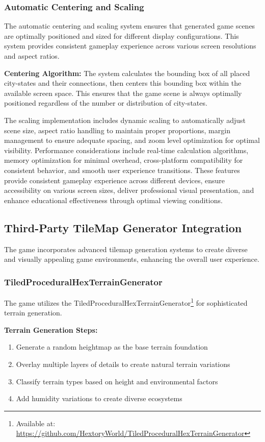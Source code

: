 \documentclass[english]{tudscrreprt}
\begin{document}
\subsubsection{Automatic Centering and Scaling}
The automatic centering and scaling system ensures that generated game scenes are optimally positioned and sized for different display configurations. This system provides consistent gameplay experience across various screen resolutions and aspect ratios.

\textbf{Centering Algorithm:}
The system calculates the bounding box of all placed city-states and their connections, then centers this bounding box within the available screen space. This ensures that the game scene is always optimally positioned regardless of the number or distribution of city-states.

The scaling implementation includes dynamic scaling to automatically adjust scene size, aspect ratio handling to maintain proper proportions, margin management to ensure adequate spacing, and zoom level optimization for optimal visibility. Performance considerations include real-time calculation algorithms, memory optimization for minimal overhead, cross-platform compatibility for consistent behavior, and smooth user experience transitions. These features provide consistent gameplay experience across different devices, ensure accessibility on various screen sizes, deliver professional visual presentation, and enhance educational effectiveness through optimal viewing conditions.

\subsection{Third-Party TileMap Generator Integration}
The game incorporates advanced tilemap generation systems to create diverse and visually appealing game environments, enhancing the overall user experience.

\subsubsection{TiledProceduralHexTerrainGenerator}
The game utilizes the TiledProceduralHexTerrainGenerator\footnote{Available at: \url{https://github.com/HextoryWorld/TiledProceduralHexTerrainGenerator}} for sophisticated terrain generation.

\textbf{Terrain Generation Steps:}
\begin{enumerate}
  \item Generate a random heightmap as the base terrain foundation
  \item Overlay multiple layers of details to create natural terrain variations
  \item Classify terrain types based on height and environmental factors
  \item Add humidity variations to create diverse ecosystems
\end{enumerate}
\end{document}

